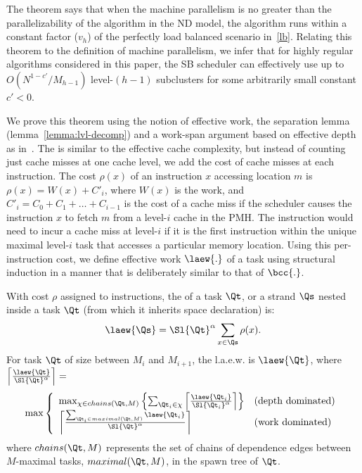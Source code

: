 The theorem says that when the machine parallelism is no greater than
the parallelizability of the algorithm in the ND model, the algorithm
runs within a constant factor ($v_h$) of the perfectly load balanced
scenario in~\eqref{lb}.  Relating this theorem to the definition of
machine parallelism, we infer that for highly regular algorithms
considered in this paper, the SB scheduler can effectively use up to
$O(N^{1-c'}/M_{h-1})$ level-$(h-1)$ subclusters for some arbitrarily
small constant $c'<0$.

We prove this theorem using the notion of effective work, the
separation lemma (lemma~\ref{lemma:lvl-decomp}) and a work-span
argument based on effective depth as in~\cite{BlellochFiGi11}.
The  is similar to the effective
cache complexity, but instead of counting just cache misses at one
cache level, we add the cost of cache misses at each instruction.
The cost $\rho(x)$ of an instruction $x$ accessing location $m$ is
$\rho(x)=W(x)+C'_{i}$, where $W(x)$ is the work, and $C'_i = C_0 + C_1
+\dots + C_{i-1}$ is the cost of a cache miss if the scheduler causes
the instruction $x$ to fetch $m$ from a level-$i$ cache in the
PMH. The instruction would need to incur a cache miss at level-$i$ if
it is the first instruction within the unique maximal level-$i$ task
that accesses a particular memory location.  Using this
per-instruction cost, we define effective work $\laew{.}$ of a task
using structural induction in a manner that is deliberately similar to
that of $\bcc{.}$.

\begin{definition}
With cost $\rho$ assigned to instructions, the  of a task $\Qt$, or a strand $\Qs$ nested inside a
task $\Qt$ (from which it inherits space declaration) is:
\noindent{}
\[
\laew{\Qs} = \Sl{\Qt}^\alpha \sum_{x\in\Qs} \rho(x).
\]
\noindent{}  For task $\Qt$ of size between $M_i$ and $M_{i+1}$,
 the l.a.e.w. is $\laew{\Qt}$, where
  $\left\lceil\frac{\laew{\Qt}}{\Sl{\Qt}^\alpha}\right\rceil = $
\begin{eqnarray*}
\max\left\{ 
\begin{array}{lll}
 \max_{\chi \in chains(\Qt,M)}
\left\{ 
\sum_{\Qt_i\in\chi}
\left\lceil\frac{\laew{\Qt_i}}{\Sl{\Qt_i}^\alpha}\right\rceil
\right\}
 & \mbox{(depth dominated)}\\
\left\lceil\frac{\sum_{\Qt_i\in maximal(\Qt,M)} \laew{\Qt_i}}{\Sl{\Qt}^\alpha}\right\rceil
 & \mbox{(work dominated)}
\end{array}
\right.
\end{eqnarray*}
where $chains(\Qt,M)$ represents the set of chains of dependence edges
between $M$-maximal tasks, $maximal(\Qt,M)$, in the spawn tree of $\Qt$.
\end{definition}

